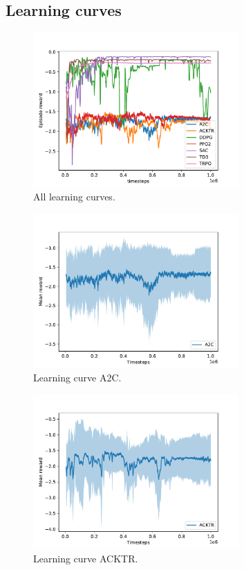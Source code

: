 \documentclass{article}
\begin{document}
\subsection{Learning curves}


\begin{figure}[H]
    \centering
    \includegraphics[width=0.7\textwidth]{../learning_curves.pdf}
\caption{All learning curves.}
\end{figure}


\begin{figure}[H]
    \centering
    \includegraphics[width=0.7\textwidth]{../A2C.pdf}
\caption{Learning curve A2C.}
\end{figure}


\begin{figure}[H]
    \centering
    \includegraphics[width=0.7\textwidth]{../ACKTR.pdf}
\caption{Learning curve ACKTR.}
\end{figure}
\end{document}
